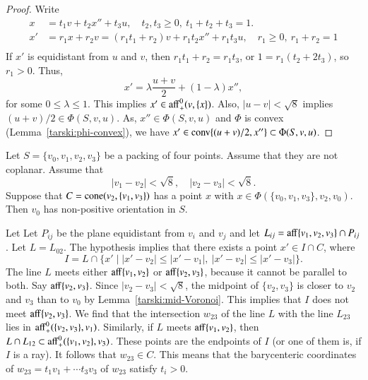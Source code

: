 \begin{tarskidata}
\begin{tarski}
\begin{proof}  Write
$$
\begin{array}{lll}
x &= t_1 v + t_2 x'' + t_3 u,\quad t_2,t_3\ge 0,\ t_1+t_2+t_3=1.\\
x' &= r_1 x + r_2 v = (r_1 t_1 + r_2) v + r_1 t_2 x'' + r_1 t_3 u,\quad r_1\ge0,\ r_1+r_2=1\\
\end{array}
$$
If $x'$ is equidistant from $u$ and $v$, then  $r_1t_1 + r_2 = r_1t_3$, or $1=r_1(t_2+2t_3)$, so $r_1>0$.
Thus, 
$$
x' = \lambda \frac{u+v}2 + (1-\lambda)x'',
$$
for some $0\le \lambda\le 1$.
This implies $x'\in{\operatorname{aff}}_+^0(v,\{x\})$.  
Also, $|u-v|<\sqrt8$ implies $(u+v)/2\in\Phi(S,v,u)$.
As, $x''\in\Phi(S,v,u)$ and $\Phi$ is convex (Lemma~\ref{tarski:phi-convex}), we have 
$x'\in{\operatorname{conv}}\{(u+v)/2,x''\}\subset\Phi(S,v,u)$.
\end{proof}

\end{tarski}






\begin{tarski}

\begin{lemma}
Let $S=\{v_0,v_1,v_2,v_3\}$ be a packing of four points.
Assume that they are not coplanar.
Assume that 
$$
|v_1-v_2|<\sqrt8,\quad  |v_2-v_3|<\sqrt8.
$$
Suppose that
$C={\operatorname{cone}}(v_2,\{v_1,v_3\})$ has a point $x$ with 
  $x\in\Phi(\{v_0,v_1,v_3\},v_2,v_0)$.    
Then $v_0$ has non-positive orientation in $S$.
\end{lemma}



\begin{proved} 
Let Let $P_{ij}$ be the plane equidistant from $v_i$ and
$v_j$ and let $L_{ij} = {\operatorname{aff}}\{v_1,v_2,v_3\}\cap P_{ij}$.
Let $L=L_{02}$.
The hypothesis implies that there exists a point 
$x'\in I \cap C$, where
   $$I= L\cap \{x'\mid |x'-v_2|\le|x'-v_1|,\ |x'-v_2|\le |x'-v_3|\}.$$  
The line $L$ meets either ${\operatorname{aff}}\{v_1,v_2\}$ or ${\operatorname{aff}}\{v_2,v_3\}$,
because it cannot be parallel to both.  Say ${\operatorname{aff}}\{v_2,v_3\}$.
Since $|v_2-v_3|<\sqrt8$, the midpoint of $\{v_2,v_3\}$ is closer
to $v_2$ and $v_3$ than to $v_0$ by Lemma~\ref{tarski:mid-Voronoi}.
This implies that $I$ does not meet ${\operatorname{aff}}\{v_2,v_3\}$.
We find that the intersection $w_{23}$ of the line $L$ with
the line $L_{23}$ lies in ${\operatorname{aff}}_+^0(\{v_2,v_3\},v_1)$.  Similarly,
if $L$ meets ${\operatorname{aff}}\{v_1,v_2\}$, then $L\cap L_{12}\subset{\operatorname{aff}}_+^0(\{v_1,v_2\},v_3)$.  These points are the endpoints of 
$I$ (or one of them is, if $I$ is a ray).  It follows that $w_{23}\in C$.
This means that the barycenteric coordinates of $w_{23}=t_1v_1+\cdots t_3 v_3$ of $w_{23}$ satisfy
$t_i>0$.


\end{proved}
\end{tarski}
\end{tarskidata}
